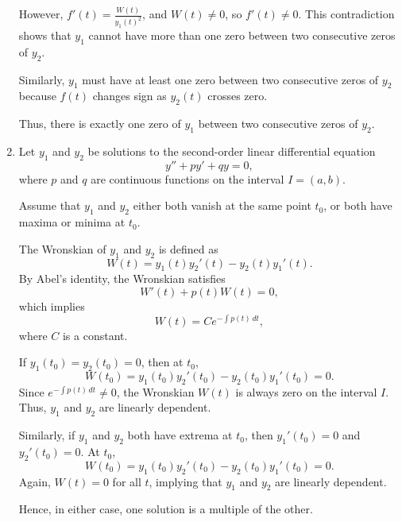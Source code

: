 \documentclass[12pt]{article}
\begin{document}
\begin{enumerate}
However, \( f'(t) = \frac{W(t)}{y_1(t)^2} \), and \( W(t) \neq 0 \), so \( f'(t) \neq 0 \). This contradiction shows that \( y_1 \) cannot have more than one zero between two consecutive zeros of \( y_2 \).

Similarly, \( y_1 \) must have at least one zero between two consecutive zeros of \( y_2 \) because \( f(t) \) changes sign as \( y_2(t) \) crosses zero.

Thus, there is exactly one zero of \( y_1 \) between two consecutive zeros of \( y_2 \).

\item Let \( y_1 \) and \( y_2 \) be solutions to the second-order linear differential equation 
\[
y'' + py' + qy = 0,
\]
where \( p \) and \( q \) are continuous functions on the interval \( I = (a, b) \).

Assume that \( y_1 \) and \( y_2 \) either both vanish at the same point \( t_0 \), or both have maxima or minima at \( t_0 \).

The Wronskian of \( y_1 \) and \( y_2 \) is defined as
\[
W(t) = y_1(t)y_2'(t) - y_2(t)y_1'(t).
\]
By Abel's identity, the Wronskian satisfies
\[
W'(t) + p(t)W(t) = 0,
\]
which implies
\[
W(t) = Ce^{-\int p(t) \, dt},
\]
where \( C \) is a constant.

If \( y_1(t_0) = y_2(t_0) = 0 \), then at \( t_0 \),
\[
W(t_0) = y_1(t_0)y_2'(t_0) - y_2(t_0)y_1'(t_0) = 0.
\]
Since \( e^{-\int p(t) \, dt} \neq 0 \), the Wronskian \( W(t) \) is always zero on the interval \( I \). Thus, \( y_1 \) and \( y_2 \) are linearly dependent.

Similarly, if \( y_1 \) and \( y_2 \) both have extrema at \( t_0 \), then \( y_1'(t_0) = 0 \) and \( y_2'(t_0) = 0 \). At \( t_0 \),
\[
W(t_0) = y_1(t_0)y_2'(t_0) - y_2(t_0)y_1'(t_0) = 0.
\]
Again, \( W(t) = 0 \) for all \( t \), implying that \( y_1 \) and \( y_2 \) are linearly dependent.

Hence, in either case, one solution is a multiple of the other.

\end{enumerate}
\end{document}
